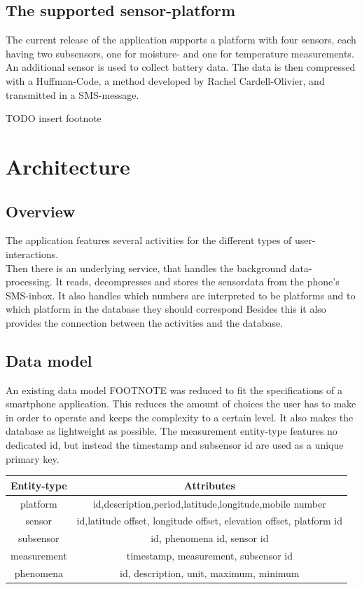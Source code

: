 \documentclass[11pt,oneside,a4paper]{scrartcl}
\begin{document}
\subsection{The supported sensor-platform}
The current release of the application supports a platform with four sensors, each having two subsensors, one for moisture- and one for temperature measurements. An additional sensor is used to collect battery data. The data is then compressed with a Huffman-Code, a method developed by Rachel Cardell-Olivier, and transmitted in a SMS-message.


TODO insert footnote
\section{Architecture}
\subsection{Overview}
The application features several activities for the different types of user-interactions. \\
Then there is an underlying service, that handles the background data-processing. It reads, decompresses and stores the sensordata from the phone's SMS-inbox. It also handles which numbers are interpreted to be platforms and to which platform in the database they should correspond Besides this it also provides the connection between the activities and the database.

\subsection{Data model}
An existing data model  FOOTNOTE was reduced to fit the specifications of a smartphone application. This reduces the amount of choices the user has to make in order to operate and keeps the complexity to a certain level. It also makes the database as lightweight as possible. The measurement entity-type features no dedicated id, but instead the timestamp and subsensor id are used as a unique primary key.

\begin{center}
\begin{tabular}{|c|c|}
\hline \textbf{ Entity-type} &  \textbf{Attributes} \\ 
\hline platform & id,description,period,latitude,longitude,mobile number \\ 
\hline sensor & id,latitude offset, longitude offset, elevation offset, platform id \\ 
\hline subsensor & id, phenomena id, sensor id \\ 
\hline measurement & timestamp, measurement, subsensor id \\ 
\hline phenomena & id, description, unit, maximum, minimum \\ 
\hline 
\end{tabular} 
\end{center}
\end{document}
